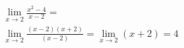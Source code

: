 \begin{ex}
\begin{align}
&\lim_{x\rightarrow 2} \frac{x^2-4}{x-2}=\nonumber\\
&\lim_{x\rightarrow 2} \frac{(x-2)(x+2)}{(x-2)}=\lim_{x\rightarrow 2} (x+2) = 4\nonumber
\end{align}
\end{ex}